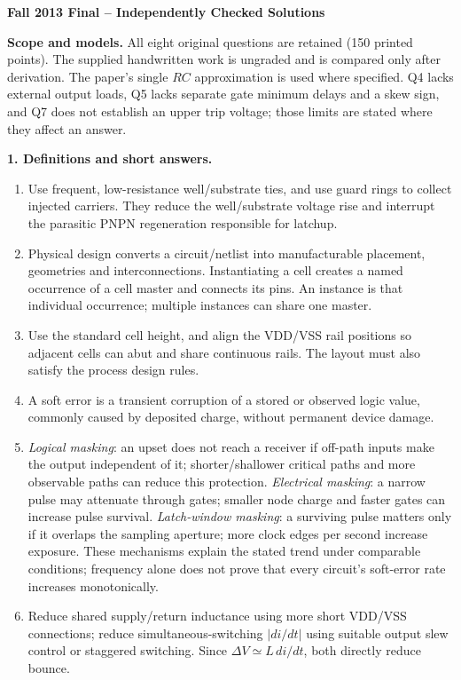 \documentclass[10pt]{article}
\begin{document}
\begin{center}{\large\bfseries Fall 2013 Final -- Independently Checked Solutions}\end{center}
\textbf{Scope and models.} All eight original questions are retained (150 printed points). The supplied handwritten work is ungraded and is compared only after derivation. The paper's single $R C$ approximation is used where specified. Q4 lacks external output loads, Q5 lacks separate gate minimum delays and a skew sign, and Q7 does not establish an upper trip voltage; those limits are stated where they affect an answer.

\textbf{1. Definitions and short answers.}
\begin{enumerate}[label=(\alph*),leftmargin=7mm,itemsep=4pt]
\item Use frequent, low-resistance well/substrate ties, and use guard rings to collect injected carriers. They reduce the well/substrate voltage rise and interrupt the parasitic PNPN regeneration responsible for latchup.
\item Physical design converts a circuit/netlist into manufacturable placement, geometries and interconnections. Instantiating a cell creates a named occurrence of a cell master and connects its pins. An instance is that individual occurrence; multiple instances can share one master.
\item Use the standard cell height, and align the VDD/VSS rail positions so adjacent cells can abut and share continuous rails. The layout must also satisfy the process design rules.
\item A soft error is a transient corruption of a stored or observed logic value, commonly caused by deposited charge, without permanent device damage.
\item \emph{Logical masking}: an upset does not reach a receiver if off-path inputs make the output independent of it; shorter/shallower critical paths and more observable paths can reduce this protection. \emph{Electrical masking}: a narrow pulse may attenuate through gates; smaller node charge and faster gates can increase pulse survival. \emph{Latch-window masking}: a surviving pulse matters only if it overlaps the sampling aperture; more clock edges per second increase exposure. These mechanisms explain the stated trend under comparable conditions; frequency alone does not prove that every circuit's soft-error rate increases monotonically.
\item Reduce shared supply/return inductance using more short VDD/VSS connections; reduce simultaneous-switching $|di/dt|$ using suitable output slew control or staggered switching. Since $\Delta V\simeq L\,di/dt$, both directly reduce bounce.

\end{enumerate}
\end{document}
